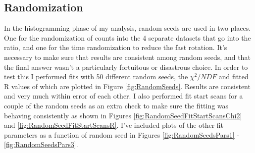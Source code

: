 	\subsection{Randomization}
	\label{Sec:Randomization}

		In the histogramming phase of my analysis, random seeds are used in two places. One for the randomization of counts into the 4 separate datasets that go into the ratio, and one for the time randomization to reduce the fast rotation. It's necessary to make sure that results are consistent among random seeds, and that the final answer wasn't a particularly fortuitous or disastrous choice. In order to test this I performed fits with 50 different random seeds, the $\chi^{2}/NDF$ and fitted R values of which are plotted in Figure \ref{fig:RandomSeeds}. Results are consistent and very much within error of each other. I also performed fit start scans for a couple of the random seeds as an extra check to make sure the fitting was behaving consistently as shown in Figures \ref{fig:RandomSeedFitStartScansChi2} and \ref{fig:RandomSeedFitStartScansR}. I've included plots of the other fit parameters as a function of random seed in Figures \ref{fig:RandomSeedsPars1} - \ref{fig:RandomSeedsPars3}.

